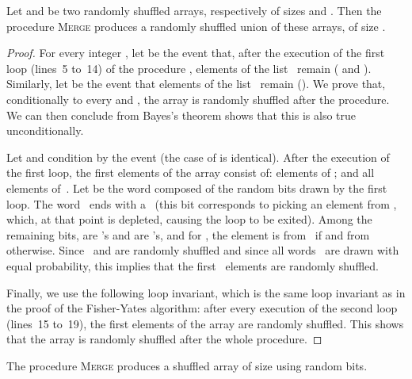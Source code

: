\documentclass[letter,11pt,en]{quick-document}
\begin{document}
\begin{lemma}
  Let  and  be two randomly shuffled arrays, respectively of sizes
   and . Then the procedure \textsc{Merge}
  produces a randomly shuffled union  of these arrays, of size
  .
\end{lemma}

\begin{proof}
  For every integer , let  be the event that,
  after the execution of the first loop (lines~5 to~14) of the procedure
  ,  elements of the list~ remain ( and
  ). Similarly, let  be the event that 
  elements of the list~ remain (). We prove that,
  conditionally to every  and , the array is
  randomly shuffled after the procedure. We can then conclude from Bayes's
  theorem shows that this is also true unconditionally.

  Let  and condition by the event  (the case
  of  is identical). After the execution of the first loop,
  the  first elements of the array consist of: 
  elements of ; and all  elements of~. Let  be the word
  composed of the  random bits drawn by the first loop. The
  word~ ends with a~ (this bit corresponds to picking an element
  from , which, at that point is depleted, causing the loop to be
  exited). Among the remaining  bits,  are 's and
   are 's, and for , the element
   is from~ if  and from  otherwise. Since~ and
   are randomly shuffled and since all words~ are drawn with equal
  probability, this implies that the first~ elements are randomly
  shuffled.

  Finally, we use the following loop invariant, which is the same loop
  invariant as in the proof of the Fisher-Yates algorithm: after every
  execution of the second loop (lines~15 to~19), the first  elements of
  the array are randomly shuffled. This shows that the array is randomly
  shuffled after the whole procedure.
\end{proof}




\begin{lemma}
  The procedure \textsc{Merge} produces a shuffled array  of size 
  using  random bits.
\end{lemma}
\end{document}
